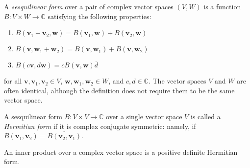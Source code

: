\documentclass{article}
\renewcommand{\v}{\mathbf{v}}
\newcommand{\w}{\mathbf{w}}
\begin{document}
A \emph{sesquilinear form} over a pair of complex vector spaces $(V,W)$ is a function $B\colon V \times W \to \mathbb{C}$ satisfying the following properties:
\begin{enumerate}
\item $B(\v_1+\v_2,\w) = B(\v_1,\w) + B(\v_2,\w)$
\item $B(\v,\w_1+\w_2) = B(\v,\w_1) + B(\v,\w_2)$
\item $B(c\v, d\w) = c B(\v,\w) \overline{d}$
\end{enumerate}
for all $\v,\v_1,\v_2 \in V$, $\w, \w_1, \w_2 \in W$, and $c,d \in \mathbb{C}$.  The vector spaces $V$ and $W$ are often identical, although the definition does not require them to be the same vector space.

A sesquilinear form $B\colon V \times V \to \mathbb{C}$ over a single vector space $V$ is called a \emph{Hermitian form} if it is complex conjugate symmetric: namely, if $B(\v_1,\v_2) = \overline{B(\v_2,\v_1)}$.

An inner product over a complex vector space is a positive definite Hermitian form.
\end{document}
